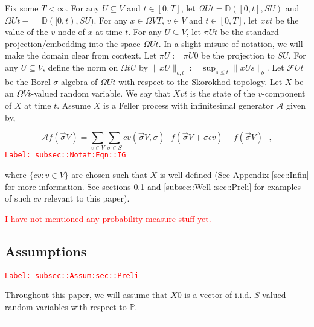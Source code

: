 \documentclass[12pt]{article}
\newcommand{\mb}{\mathbb}
\newcommand{\mc}{\mathcal}
\newcommand{\ep}{\epsilon}
\newcommand{\tr}{\textcolor{red}}
\newcommand{\labe}[1]{\tr{\texttt{Label: #1}}}
\newcommand{\ind}{\hspace{24pt}}
\newcommand{\lin}{\rule{\linewidth}{0.4 pt}}
\newcommand{\pr}{\mb{P}}							%
\newcommand{\defeq}{:=}								%
\newcommand{\cad}{\mb{D}}							%
\renewcommand{\v}{v}							%
\renewcommand{\U}{U}							%
\renewcommand{\S}{S}							%
\newcommand{\s}{\sigma}							%
\newcommand{\sv}{\vec{\s}}						%
\renewcommand{\b}{b}							%
\newcommand{\ev}{\ep}							%
\newcommand{\T}{T}								%
\newcommand{\x}{x}								%
\renewcommand{\t}{t}							%
\newcommand{\proj}{\pi}							%
\renewcommand{\tt}{s}							%
\newcommand{\F}{\mc{F}}							%
\newcommand{\X}{X}								%
\newcommand{\IG}{\mc{A}}						%
\newcommand{\IGr}{c}							%
\begin{document}
\ind Fix some \(\T < \infty\). For any \(\U\subseteq V\) and \(\t\in [0,\T]\), let \(\Omega{\U}{\t} = \cad([0,\t],\S{\U})\) and \(\Omega{\U}{\t-} = \cad([0,\t),\S{\U})\). For any \(\x{}{} \in \Omega{V}{\T}\), \(\v\in V\) and  \(\t \in [0,\T]\), let \(\x{\v}{\t}\) be the value of the \(\v\)-node of \(\x{}{}\) at time \(\t\). For any \(\U\subseteq V\), let \(\proj{\U}{\t}\) be the standard projection/embedding into the space \(\Omega{\U}{\t}\). In a slight misuse of notation, we will make the domain clear from context. Let \(\proj{\U}{} \defeq \proj{\U}{0}\) be the projection to \(\S{\U}\). For any \(\U\subseteq V\), define the norm on \(\Omega{\t}{\U}\) by \(\|\x{\U}{}\|_{\b{},\t} \defeq \sup_{\tt \leq \t} \|\x{\U}{\tt}\|_{\b{}}\). Let \(\F{\U}{\t}\) be the Borel \(\sigma\)-algebra of \(\Omega{\U}{\t}\) with respect to the Skorokhod topology. Let \(\X{}{}\) be an \(\Omega{V}{\t}\)-valued random variable. We say that \(\X{\v}{\t}\) is the state of the \(\v\)-component of \(\X{}{}\) at time \(\t\). Assume \(\X{}{}\) is a Feller process with infinitesimal generator \(\IG\) given by,

\begin{equation}
\IG f(\sv{}{V}) = \sum_{\v \in V}\sum_{\s \in \S} \IGr{\v}(\sv{}{V},\s)[f(\sv{}{V} + \s \ev{\v}) - f(\sv{}{V})],
\label{subsec::Notat:Eqn::IG}
\end{equation}
\labe{subsec::Notat:Eqn::IG}

where \(\{\IGr{\v}:\v\in V\}\) are chosen such that \(\X{}{}\) is well-defined (See Appendix \ref{sec::Infin} for more information. See sections \ref{subsec::Assum:sec::Preli} and \ref{subsec::Well-:sec::Preli} for examples of such \(\IGr{\v}\) relevant to this paper). 

\tr{I have not mentioned any probability measure stuff yet.}

\subsection{Assumptions}
\label{subsec::Assum:sec::Preli}\labe{subsec::Assum:sec::Preli}

Throughout this paper, we will assume that \(\X{}{0}\) is a vector of i.i.d. \(\S\)-valued random variables with respect to \(\pr\).

\lin
\end{document}
